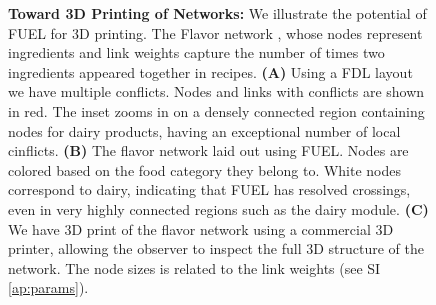 \documentclass[nofootinbib,preprint,floatfix,titlepage,superscriptaddress]{revtex4} %
\begin{document}
\begin{figure}
    \caption{\scriptsize {\bf Toward 3D Printing of Networks:}
    We illustrate the potential of FUEL for 3D printing.  
    The Flavor network \cite{ahn2011flavor}, whose nodes represent ingredients and link weights capture the number of times two ingredients appeared together in recipes. 
    {\bf (A)} Using a FDL layout we have multiple conflicts.  
    Nodes and links with conflicts are shown in red. 
    The inset zooms in on a densely connected region containing nodes for dairy products, having an exceptional number of local cinflicts. 
    {\bf (B)} The flavor network laid out using FUEL. Nodes are colored based on the food category they belong to. 
    White nodes correspond to dairy, indicating that 
    FUEL has %
    resolved crossings, even in very highly connected regions such as the dairy module.  
    {\bf (C)} We have 3D print of the flavor network using a commercial 3D printer, allowing the observer to inspect the full 3D structure of the network. %
    The node sizes is related to the link weights (see SI \ref{ap:params}). 
    }
    \label{fig:3d-print}
    \newpage
\end{figure}
%
\end{document}
